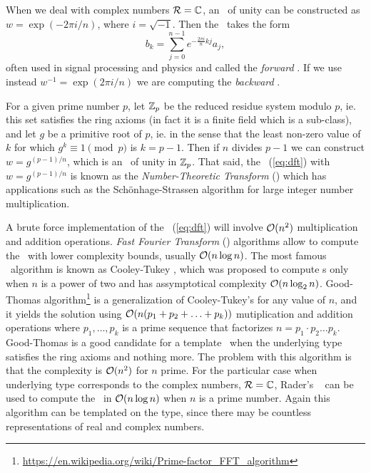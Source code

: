 \begin{example}
    When we deal with complex numbers $\mathcal{R} = \mathbb{C}$, an \ of unity
    can be constructed as $w = \exp(- 2 \pi i/n)$, where $i = \sqrt{-1}$.
    Then the \dft\ takes the form
    \begin{equation} 
        b_k = \sum_{j=0}^{n-1} e^{-\frac{2\pi i}{n} kj}  a_j,
        \label{eq:complex}
    \end{equation}
    often used in signal processing and physics and called the \emph{forward} \dft.
    If we use instead $w^{-1} = \exp(2 \pi i/n)$ we are computing the
    \emph{backward} \dft.
    \label{ex:complex}
\end{example}

\begin{example}
   For a given prime number $p$, let $\mathbb{Z}_p$ be the reduced residue system
   modulo $p$, ie. this set satisfies the ring axioms (in fact it is a finite
   field which is a sub-class), and let $g$ be a primitive root of $p$, ie. in the
   sense that the least non-zero value of $k$ for which $g^k \equiv 1 \pmod p$ is
   $k=p-1$. Then if $n$ divides $p-1$ we can construct $w = g^{(p-1)/n}$, which
   is an \ of unity in $\mathbb{Z}_p$. That said, the \dft\
   (\ref{eq:dft}) with $w = g^{(p-1)/n}$ is known as the \emph{Number-Theoretic
   Transform} (\ntt) which has applications such as the Sch\"onhage-Strassen
   algorithm for large integer number multiplication.
   \label{ex:ntt}
\end{example}

A brute force implementation of the \dft\ (\ref{eq:dft}) will involve
$\mathcal{O}(n^2)$ multiplication and addition operations.
\emph{Fast Fourier Transform} (\fft) algorithms allow to compute the \dft\ with
lower complexity bounds, usually $\mathcal{O}(n \log n)$.
The most famous \fft\ algorithm is known as Cooley-Tukey \cite{cooley65}, which
was proposed to compute \fft{}s only when $n$ is a power of two and has
assymptotical complexity $\mathcal{O}(n \log_2 n)$.
Good-Thomas 
algorithm\footnote{\url{https://en.wikipedia.org/wiki/Prime-factor_FFT_algorithm}}
is a generalization of Cooley-Tukey's for any value of $n$, and it yields the
solution using $\mathcal{O}(n (p_1 + p_2 + \ldots + p_k) )$ mutiplication and
addition operations where $p_1,\ldots,p_k$ is a prime sequence that factorizes $n = p_1\cdot
p_2 \ldots p_k$. 
Good-Thomas is a good candidate for a template \fft\ when the
underlying type satisfies the ring axioms and nothing more.
The problem with this algorithm is that the complexity is $\mathcal{O}(n^2)$ for $n$
prime. For the particular case when underlying type corresponds to the complex numbers, 
$\mathcal{R} = \mathbb{C}$, 
Rader's \fft\ \cite{rader68}
can be used to compute the \dft\ in $\mathcal{O}(n\log n)$ when $n$ is a prime
number. Again this algorithm can be templated on the type, since there may be
countless representations of real and complex numbers.

